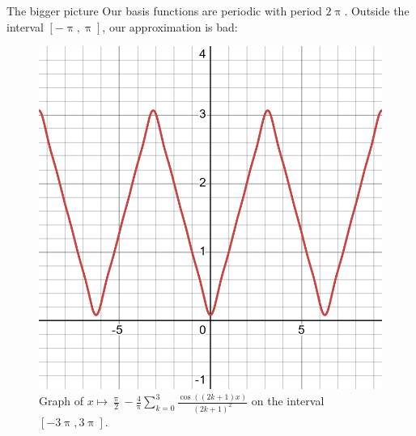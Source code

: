 \documentclass[portrait,fleqn,12pt]{beamer}
\begin{document}
\begin{frame}{The bigger picture}
  Our basis functions are periodic with period $2 \uppi$. Outside
  the interval $[-\uppi, \uppi]$, our approximation is bad:
  \begin{center}
    \begin{figure}
  \includegraphics[scale=0.15]{desmos-graph(22).png}
  \caption{Graph of $x\mapsto \frac{\uppi}{2} 
  - \frac{4}{\uppi}
    \sum_{k=0}^3 \frac{\cos((2 k+1) x)}{(2k+1)^2}$
    on the interval $[-3\uppi, 3\uppi]$.}
    \end{figure}
  \end{center}
\end{frame}
\end{document}
